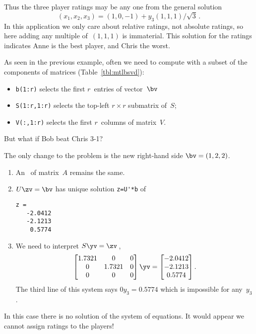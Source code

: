 \begin{example}
\begin{solution}
Thus the three player ratings may be any one from the general solution
\begin{displaymath}
    (x_1,x_2,x_3) =(1,0,-1)
    +y_3(1,1,1)/\sqrt3\,.
\end{displaymath}
In this application we only care about relative ratings, not absolute ratings, so here adding any multiple of~\((1,1,1)\) is immaterial.
This solution for the ratings indicates Anne is the best player, and Chris the worst. 
\end{solution}
\end{example}


\begin{compute}
As seen in the previous example, often we need to compute with a subset of the components of matrices (Table~\ref{tbl:mtlbsvd}):
\begin{itemize}
\item \verb|b(1:r)| selects the first \(r\)~entries of vector~\(\bv\)
\item \verb|S(1:r,1:r)| selects the top-left \(r\times r\) submatrix of~\(S\);
\item \verb|V(:,1:r)| selects the first \(r\)~columns of matrix~\(V\).
\end{itemize}
\end{compute}



\begin{example} \label{eg:rstp2}
But what if Bob beat Chris 3-1?  
\begin{solution} 
The only change to the problem is the new right-hand side \(\bv=(1,2,2)\).
\begin{enumerate}
\item An \svd\ of matrix~\(A\) remains the same.
\item \(U\zv=\bv\) has unique solution \verb|z=U'*b| of
\begin{verbatim}
z =
   -2.0412
   -2.1213
    0.5774
\end{verbatim}
\item We need to interpret \(S\yv=\zv\)\,,
\begin{equation*}
\begin{bmatrix} 1.7321&0&0
\\0&1.7321&0
\\0&0&0 \end{bmatrix}\yv=\begin{bmatrix} 
   -2.0412\\-2.1213\\0.5774
\end{bmatrix}.
\end{equation*}
The third line of this system says \(0y_3=0.5774\) which is impossible for any~\(y_3\).
\end{enumerate}
In this case there is no solution of the system of equations.
It would appear we cannot assign ratings to the players!  
\end{solution}
\end{example}

